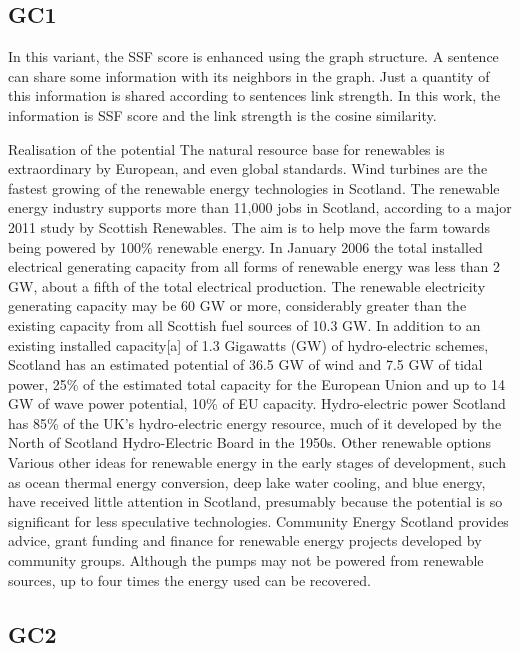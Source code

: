 \subsection{GC1}

In this variant, the SSF score is enhanced using the graph structure. 
A sentence can share some information with its neighbors in the graph. 
Just a quantity of this information is shared according to sentences link strength. 
In this work, the information is SSF score and the link strength is the cosine similarity.

\begin{tcolorbox}\footnotesize
	Realisation of the potential The natural resource base for renewables is extraordinary by European, and even global standards.
	Wind turbines are the fastest growing of the renewable energy technologies in Scotland.
	The renewable energy industry supports more than 11,000 jobs in Scotland, according to a major 2011 study by Scottish Renewables.
	The aim is to help move the farm towards being powered by 100\% renewable energy.
	In January 2006 the total installed electrical generating capacity from all forms of renewable energy was less than 2 GW, about a fifth of the total electrical production.
	The renewable electricity generating capacity may be 60 GW or more, considerably greater than the existing capacity from all Scottish fuel sources of 10.3 GW.
	In addition to an existing installed capacity[a] of 1.3 Gigawatts (GW) of hydro-electric schemes, Scotland has an estimated potential of 36.5 GW of wind and 7.5 GW of tidal power, 25\% of the estimated total capacity for the European Union and up to 14 GW of wave power potential, 10\% of EU capacity.
	Hydro-electric power Scotland has 85\% of the UK's hydro-electric energy resource, much of it developed by the North of Scotland Hydro-Electric Board in the 1950s.
	Other renewable options Various other ideas for renewable energy in the early stages of development, such as ocean thermal energy conversion, deep lake water cooling, and blue energy, have received little attention in Scotland, presumably because the potential is so significant for less speculative technologies.
	Community Energy Scotland provides advice, grant funding and finance for renewable energy projects developed by community groups.
	Although the pumps may not be powered from renewable sources, up to four times the energy used can be recovered.
\end{tcolorbox}

\subsection{GC2}

